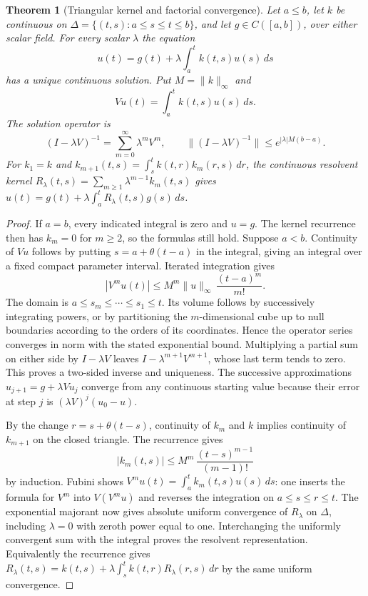 \documentclass[11pt,oneside,openany]{book}
\theoremstyle{plain}
\newtheorem{theorem}{Theorem}[chapter]
\theoremstyle{definition}
\theoremstyle{remark}
\begin{document}
\begin{theorem}[Triangular kernel and factorial convergence]
\label{thm:pde-volterra}
Let \(a\leq b\), let \(k\) be continuous on
\(\Delta=\{(t,s):a\leq s\leq t\leq b\}\), and let
\(g\in C([a,b])\), over either scalar field. For every scalar
\(\lambda\) the equation
\[
 u(t)=g(t)+\lambda\int_a^t k(t,s)u(s)\,ds
\]
has a unique continuous solution. Put \(M=\|k\|_\infty\) and
\[
 Vu(t)=\int_a^t k(t,s)u(s)\,ds .
\]
The solution operator is
\[
 (I-\lambda V)^{-1}=\sum_{m=0}^\infty\lambda^m V^m,
 \qquad \|(I-\lambda V)^{-1}\|\leq e^{|\lambda|M(b-a)} .
\]
For \(k_1=k\) and
\(k_{m+1}(t,s)=\int_s^t k(t,r)k_m(r,s)\,dr\),
the continuous resolvent kernel
\(R_\lambda(t,s)=\sum_{m\geq1}\lambda^{m-1}k_m(t,s)\)
gives
\(u(t)=g(t)+\lambda\int_a^t R_\lambda(t,s)g(s)\,ds\).
\end{theorem}

\begin{proof}
If \(a=b\), every indicated integral is zero and \(u=g\).
The kernel recurrence then has \(k_m=0\) for \(m\geq2\),
so the formulas still hold. Suppose \(a<b\).
Continuity of \(Vu\) follows by putting \(s=a+\theta(t-a)\)
in the integral, giving an integral over a fixed compact
parameter interval. Iterated integration gives
\[
 |V^m u(t)|\leq M^m\|u\|_\infty\,\frac{(t-a)^m}{m!}.
\]
The domain is \(a\leq s_m\leq\cdots\leq s_1\leq t\).
Its volume follows by successively integrating powers, or by
partitioning the \(m\)-dimensional cube up to null boundaries
according to the orders of its coordinates. Hence the operator
series converges in norm with the stated exponential bound.
Multiplying a partial sum on either side by \(I-\lambda V\)
leaves \(I-\lambda^{m+1}V^{m+1}\), whose last term tends to
zero. This proves a two-sided inverse and uniqueness. The
successive approximations \(u_{j+1}=g+\lambda V u_j\) converge
from any continuous starting value because their error at step
\(j\) is \((\lambda V)^j(u_0-u)\).

By the change \(r=s+\theta(t-s)\), continuity of \(k_m\) and \(k\)
implies continuity of \(k_{m+1}\) on the closed triangle.
The recurrence gives
\[
 |k_m(t,s)|\leq M^m\,\frac{(t-s)^{m-1}}{(m-1)!}
\]
by induction. Fubini shows
\(V^m u(t)=\int_a^t k_m(t,s)u(s)\,ds\): one inserts the
formula for \(V^m\) into \(V(V^m u)\) and reverses the
integration on \(a\leq s\leq r\leq t\).
The exponential majorant now gives absolute uniform convergence
of \(R_\lambda\) on \(\Delta\), including \(\lambda=0\) with
zeroth power equal to one. Interchanging the uniformly convergent
sum with the integral proves the resolvent representation.
Equivalently the recurrence gives
\(R_\lambda(t,s)=k(t,s)+\lambda\int_s^t
k(t,r)R_\lambda(r,s)\,dr\) by the same uniform convergence.
\end{proof}
\end{document}
